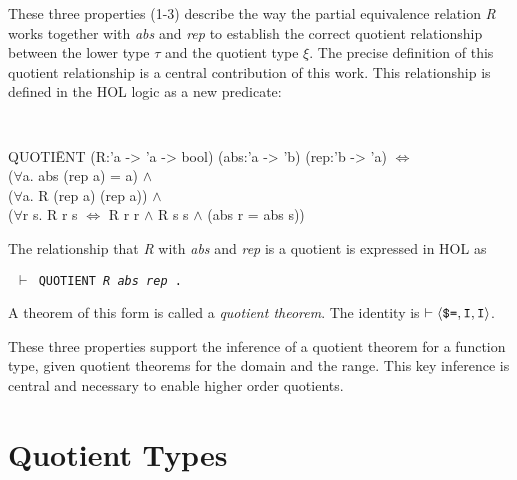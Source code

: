 \documentclass[envcountsame,runningheads]{llncs}
\newcommand{\quotient}{partial equivalence}
\begin{document}
These three properties (1-3) describe the way
the \quotient{} relation {\it R\/} works together with 
{\it abs\/} and {\it rep}
to establish the correct
quotient relationship between the lower type $\tau$
and the quotient type $\xi$.
The precise definition of this quotient relationship
is a central contribution of this work.
This relationship is defined in the HOL logic as a new predicate:
{\tt
\begin{tabbing}
\hspace{3.5mm}
  QUOTI\=ENT  (R:'a -> 'a -> bool) (abs:'a -> 'b) (rep:'b -> 'a) $\Leftrightarrow$ \\
\>       ($\forall$a. abs (rep a) = a) $\wedge$ \\
\>       ($\forall$a. R (rep a) (rep a)) $\wedge$ \\
\>       ($\forall$r s. R r s $\Leftrightarrow$ R r r $\wedge$ R s s $\wedge$ (abs r = abs s))
\end{tabbing}}

\noindent
The relationship that {\it R\/} with {\it abs\/} and {\it rep\/}
is a quotient is
expressed in HOL as
\begin{center}
\tt
$\vdash$ QUOTIENT {\it R\/} {\it abs\/} {\it rep} .
\end{center}

\noindent
A theorem of this form is called a {\it quotient theorem}.
The identity is
$\vdash \langle \mbox{\tt \$=}, \mbox{\tt I}, \mbox{\tt I} \rangle$.

\begin{comment}
The traditional construction requires the elements of the
quotient
type to be subsets of the original type.
This definition of quotients only requires them to be isomorphic.
\end{comment}
%
These three properties support the inference of a quotient theorem for a 
function type, given quotient theorems for the domain and the range.
This key inference is central and necessary to enable higher order quotients.


%
\section{Quotient Types}
%
\label{quotienttypes}
\end{document}
